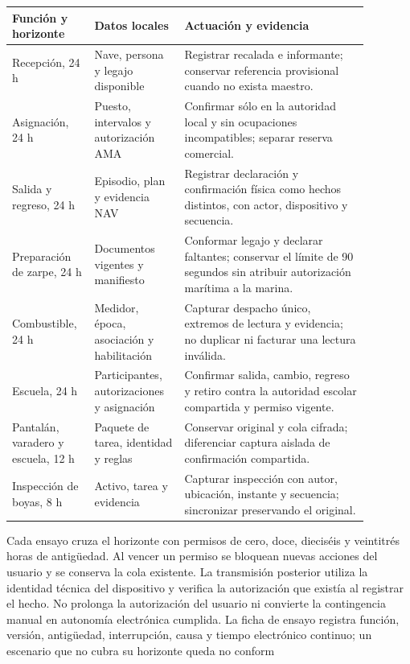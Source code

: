 \begingroup\small
\begin{longtable}{@{}p{0.18\linewidth}p{0.23\linewidth}p{0.47\linewidth}@{}}
\textbf{Función y horizonte} & \textbf{Datos locales} & \textbf{Actuación y evidencia} \\
\hline
Recepción, 24 h & Nave, persona y legajo disponible & Registrar recalada e informante; conservar referencia provisional cuando no exista maestro. \\
Asignación, 24 h & Puesto, intervalos y autorización AMA & Confirmar sólo en la autoridad local y sin ocupaciones incompatibles; separar reserva comercial. \\
Salida y regreso, 24 h & Episodio, plan y evidencia NAV & Registrar declaración y confirmación física como hechos distintos, con actor, dispositivo y secuencia. \\
Preparación de zarpe, 24 h & Documentos vigentes y manifiesto & Conformar legajo y declarar faltantes; conservar el límite de 90 segundos sin atribuir autorización marítima a la marina. \\
Combustible, 24 h & Medidor, época, asociación y habilitación & Capturar despacho único, extremos de lectura y evidencia; no duplicar ni facturar una lectura inválida. \\
Escuela, 24 h & Participantes, autorizaciones y asignación & Confirmar salida, cambio, regreso y retiro contra la autoridad escolar compartida y permiso vigente. \\
Pantalán, varadero y escuela, 12 h & Paquete de tarea, identidad y reglas & Conservar original y cola cifrada; diferenciar captura aislada de confirmación compartida. \\
Inspección de boyas, 8 h & Activo, tarea y evidencia & Capturar inspección con autor, ubicación, instante y secuencia; sincronizar preservando el original. \\
\end{longtable}
\endgroup

Cada ensayo cruza el horizonte con permisos de cero, doce, dieciséis y veintitrés horas de antigüedad. Al vencer un permiso se bloquean nuevas acciones del usuario y se conserva la cola existente. La transmisión posterior utiliza la identidad técnica del dispositivo y verifica la autorización que existía al registrar el hecho. No prolonga la autorización del usuario ni convierte la contingencia manual en autonomía electrónica cumplida. La ficha de ensayo registra función, versión, antigüedad, interrupción, causa y tiempo electrónico continuo; un escenario que no cubra su horizonte queda no conform

